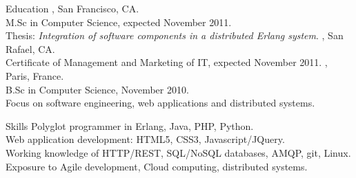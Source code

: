 \documentclass{resume}
\author{~~~~~~Edouard Swiac}
\begin{document}
\maketitle


\begin{category}{Education}
, San Francisco, CA.
\\M.Sc in Computer Science, expected November 2011.
\\Thesis: \emph{Integration of software components in a distributed Erlang system}.
, San Rafael, CA.
\\Certificate of Management and Marketing of IT, expected November 2011.
, Paris, France.
\\B.Sc in Computer Science, November 2010.
\\Focus on software engineering, web applications and distributed systems.
\end{category}


\begin{category}{Skills}
\citemnobullet 
Polyglot programmer in Erlang, Java, PHP, Python.
\\Web application development: HTML5, CSS3, Javascript/JQuery.
\\Working knowledge of HTTP/REST, SQL/NoSQL databases, AMQP, git, Linux.
\\Exposure to Agile development, Cloud computing, distributed systems.
\end{category}
\end{document}
